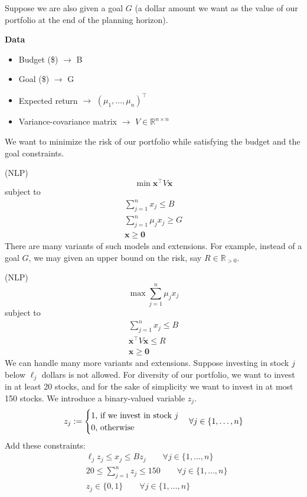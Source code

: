 Suppose we are also given a goal $G$ (a dollar amount we want as the value
of our portfolio at the end of the planning horizon).

\textbf{Data}
\begin{itemize}
    \item Budget (\$) $\rightarrow$ B
    \item Goal (\$) $\rightarrow$ G
    \item Expected return $\rightarrow$ $ (\mu_1,\ldots,\mu_n)^\top $
    \item Variance-covariance matrix $\rightarrow$ 
    $V\in \mathbb{R}^{n\times n}$
\end{itemize}
We want to minimize the risk of our portfolio while satisfying the budget and
the goal constraints. 

(NLP)
\[\min \bm{x}^\top  V\bm{x}\]
subject to
\begin{align*}
    \sum_{j = 1}^{n}x_j\le B\\
    \sum_{j = 1}^{n}\mu_jx_j\ge G\\
    \bm{x}\ge \bm{0}
\end{align*}
There are many variants of such models and extensions. For example, instead
of a goal $G$, we may given an upper bound on the risk, say 
$R\in\mathbb{R}_{>0}$.

(NLP)
\[\max \sum_{j = 1}^{n}\mu_jx_j\]
subject to
\begin{align*}
    \sum_{j = 1}^{n}x_j\le B\\
    \bm{x}^\top  V\bm{x}\le R\\
    \bm{x}\ge \bm{0}
\end{align*}
We can handle many more variants and extensions. Suppose investing in stock
$j$ below $\ell_j$ dollars is not allowed. For diversity of our portfolio, we
want to invest in at least 20 stocks, and for the sake of simplicity we want
to invest in at most 150 stocks. We introduce a binary-valued variable $z_j$.
\[z_j:=
\begin{cases}
    1 \text{, if we invest in stock $j$}\\
    0 \text{, otherwise}
\end{cases}
\forall j\in\{1,\dots,n\}\\
\]
Add these constraints:
\begin{align*}
    &\ell_j z_j\le x_j\le B z_j\qquad \forall j\in\{1,\dots,n\}\\
    &20\le \sum_{j = 1}^{n}z_j\le 150 \qquad \forall j\in\{1,\dots,n\}\\
    &z_j\in\{0,1\} \qquad \forall j\in\{1,\dots,n\}\\
\end{align*}